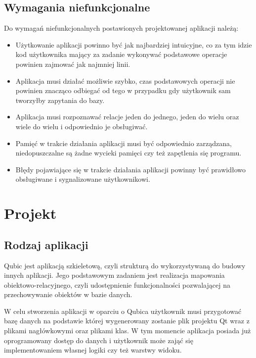 \documentclass[12pt]{report}
\begin{document}
\subsection{Wymagania niefunkcjonalne}

Do wymagań niefunkcjonalnych postawionych projektowanej aplikacji należą:

\begin{itemize}
\item Użytkowanie aplikacji powinno być jak najbardziej intuicyjne, co za tym idzie kod użytkownika mający za zadanie wykonywać podstawowe operacje powinien zajmować
jak najmniej linii.
\item Aplikacja musi działać możliwie szybko, czas podstawowych operacji nie powinien znacząco odbiegać od tego w przypadku gdy użytkownik sam two\-rzyłby zapytania do bazy.
\item Aplikacja musi rozpoznawać relacje jeden do jednego, jeden do wielu oraz wiele do wielu i odpowiednio je obsługiwać.
\item Pamięć w trakcie działania aplikacji musi być odpowiednio zarządzana, niedopuszczalne są żadne wycieki pamięci czy też zapętlenia się programu.
\item Błędy pojawiające się w trakcie działania aplikacji powinny być prawidłowo obsługiwane i sygnalizowane użytkownikowi.
\end{itemize}

\section{Projekt}

\subsection{Rodzaj aplikacji}

Qubic jest aplikacją szkieletową, czyli strukturą do wykorzystywaną do budowy innych aplikacji. Jego podstawowym zadaniem jest realizacja mapowania obiektowo-relacyjnego,
czyli udostępnienie funkcjonalności pozwalającej na przechowywanie obiektów w bazie danych.

W celu stworzenia aplikacji w oparciu o Qubica użytkownik musi przygotować bazę danych na podstawie której wygenerowany zostanie plik projektu Qt wraz z plikami nagłówkowymi
oraz plikami klas. W tym momencie aplikacja posiada już oprogramowany dostęp do danych i użytkownik może zająć się implementowaniem własnej logiki czy też warstwy widoku.
\end{document}

